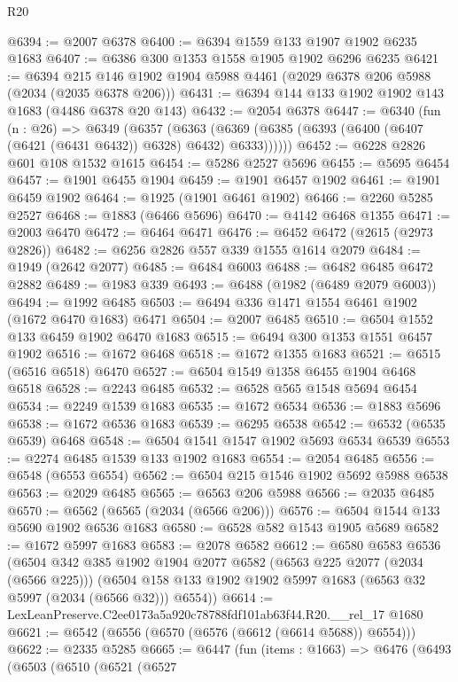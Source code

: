 \begin{lexlean}{R20}
\begin{coremodule}
@6394 := @2007 @6378
@6400 := @6394 @1559 @133 @1907 @1902 @6235 @1683
@6407 := @6386 @300 @1353 @1558 @1905 @1902 @6296 @6235
@6421 := @6394 @215 @146 @1902 @1904 @5988 @4461 (@2029 @6378 @206 @5988 (@2034 (@2035 @6378 @206)))
@6431 := @6394 @144 @133 @1902 @1902 @143 @1683 (@4486 @6378 @20 @143)
@6432 := @2054 @6378
@6447 := @6340
    (fun (n : @26) =>
    @6349
      (@6357
        (@6363 (@6369 (@6385 (@6393 (@6400 (@6407 (@6421 (@6431 @6432)) @6328) @6432) @6333))))))
@6452 := @6228 @2826 @601 @108 @1532 @1615
@6454 := @5286 @2527 @5696
@6455 := @5695 @6454
@6457 := @1901 @6455 @1904
@6459 := @1901 @6457 @1902
@6461 := @1901 @6459 @1902
@6464 := @1925 (@1901 @6461 @1902)
@6466 := @2260 @5285 @2527
@6468 := @1883 (@6466 @5696)
@6470 := @4142 @6468 @1355
@6471 := @2003 @6470
@6472 := @6464 @6471
@6476 := @6452 @6472 (@2615 (@2973 @2826))
@6482 := @6256 @2826 @557 @339 @1555 @1614 @2079
@6484 := @1949 (@2642 @2077)
@6485 := @6484 @6003
@6488 := @6482 @6485 @6472 @2882
@6489 := @1983 @339
@6493 := @6488 (@1982 (@6489 @2079 @6003))
@6494 := @1992 @6485
@6503 := @6494 @336 @1471 @1554 @6461 @1902 (@1672 @6470 @1683) @6471
@6504 := @2007 @6485
@6510 := @6504 @1552 @133 @6459 @1902 @6470 @1683
@6515 := @6494 @300 @1353 @1551 @6457 @1902
@6516 := @1672 @6468
@6518 := @1672 @1355 @1683
@6521 := @6515 (@6516 @6518) @6470
@6527 := @6504 @1549 @1358 @6455 @1904 @6468 @6518
@6528 := @2243 @6485
@6532 := @6528 @565 @1548 @5694 @6454
@6534 := @2249 @1539 @1683
@6535 := @1672 @6534
@6536 := @1883 @5696
@6538 := @1672 @6536 @1683
@6539 := @6295 @6538
@6542 := @6532 (@6535 @6539) @6468
@6548 := @6504 @1541 @1547 @1902 @5693 @6534 @6539
@6553 := @2274 @6485 @1539 @133 @1902 @1683
@6554 := @2054 @6485
@6556 := @6548 (@6553 @6554)
@6562 := @6504 @215 @1546 @1902 @5692 @5988 @6538
@6563 := @2029 @6485
@6565 := @6563 @206 @5988
@6566 := @2035 @6485
@6570 := @6562 (@6565 (@2034 (@6566 @206)))
@6576 := @6504 @1544 @133 @5690 @1902 @6536 @1683
@6580 := @6528 @582 @1543 @1905 @5689
@6582 := @1672 @5997 @1683
@6583 := @2078 @6582
@6612 := @6580
    @6583
    @6536
    (@6504
      @342
      @385
      @1902
      @1904
      @2077
      @6582
      (@6563 @225 @2077 (@2034 (@6566 @225)))
      (@6504 @158 @133 @1902 @1902 @5997 @1683 (@6563 @32 @5997 (@2034 (@6566 @32))) @6554))
@6614 := LexLeanPreserve.C2ee0173a5a920c78788fdf101ab63f44.R20.__rel_17 @1680
@6621 := @6542 (@6556 (@6570 (@6576 (@6612 (@6614 @5688)) @6554)))
@6622 := @2335 @5285
@6665 := @6447
    (fun (items : @1663) =>
    @6476
      (@6493
        (@6503
          (@6510
            (@6521
              (@6527

\end{coremodule}
\end{lexlean}
